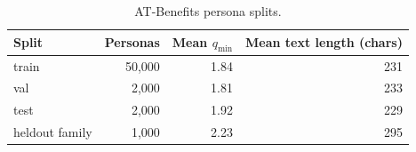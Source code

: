 \begin{table}[t]
\centering
\small
\caption{AT-Benefits persona splits.}
\label{tab:personas}
\setlength{\tabcolsep}{4pt}
\begin{tabular}{lrrr}
\toprule
Split & Personas & Mean $q_{\min}$ & Mean text length (chars) \\
\midrule
train & 50{,}000 & 1.84 & 231 \\
val & 2{,}000 & 1.81 & 233 \\
test & 2{,}000 & 1.92 & 229 \\
heldout family & 1{,}000 & 2.23 & 295 \\
\bottomrule
\end{tabular}
\par{}
\end{table}
